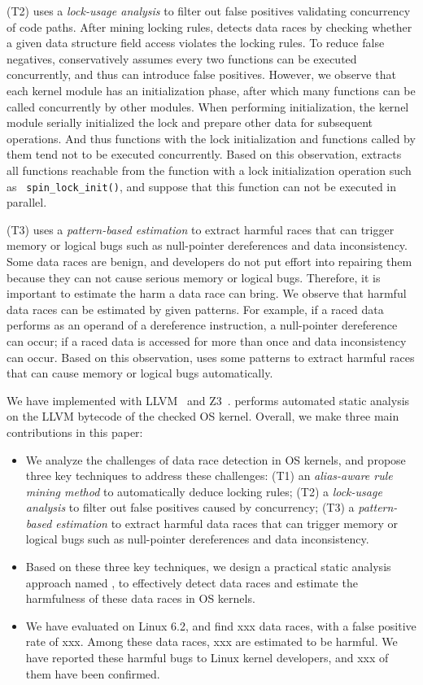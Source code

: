 (T2) \sys uses a {\em lock-usage analysis} to filter out false positives 
validating concurrency of code paths. After mining locking rules, \sys detects 
data races by checking whether a given data structure field access violates the 
locking rules. To reduce false negatives, \sys conservatively assumes 
every two functions can be executed concurrently, and thus can introduce false 
positives. However, we observe that each kernel module has an initialization 
phase, after which many functions can be called concurrently by other modules. 
When performing initialization, the kernel module serially initialized the lock 
and prepare other data for subsequent operations. And thus functions with the 
lock initialization and functions called by them tend not to be executed 
concurrently. Based on this observation, \sys extracts all functions 
reachable from the function with a lock initialization operation such as {\tt 
spin\_lock\_init()}, and suppose that this function can not be executed in 
parallel.

(T3) \sys uses a {\em pattern-based estimation} to extract harmful races 
that can trigger memory or logical bugs such as null-pointer dereferences and 
data inconsistency. Some data races are benign, and developers do not put 
effort into repairing them because they can not cause serious memory or logical 
bugs. Therefore, it is important to estimate the harm a data race can bring. We 
observe that harmful data races can be estimated by given patterns. For 
example, if a raced data performs as an operand of a dereference instruction, a 
null-pointer dereference can occur; if a raced data is accessed for more than 
once and data inconsistency can occur. Based on this observation, \sys 
uses some patterns to extract harmful races that can cause memory or logical 
bugs automatically.

We have implemented \sys with LLVM~\cite{clang} and Z3~\cite{z3}. 
\sys performs automated static analysis on the LLVM bytecode of the 
checked OS kernel. Overall, we make three main contributions in this paper:

\begin{itemize}
	\item We analyze the challenges of data race detection in OS kernels, and 
	propose three key techniques to address	these challenges: (T1) an {\em 
	alias-aware rule mining method} to automatically deduce locking rules; (T2) 
	a {\em lock-usage analysis} to filter out false positives caused by 
	concurrency; (T3) a {\em pattern-based estimation} to extract harmful data 
	races that can trigger memory or logical bugs such as null-pointer 
	dereferences and data inconsistency.
	\item Based on these three key techniques, we design a practical static 
	analysis approach named \sys, to effectively detect data races and 
	estimate the harmfulness of these data races in OS kernels.
	\item We have evaluated \sys on Linux 6.2, and find xxx data races, 	
	with a false positive rate of xxx. Among these data races, xxx are 
	estimated to be harmful. We have reported these harmful bugs to Linux 
	kernel developers, and xxx of them have been confirmed.
\end{itemize}

